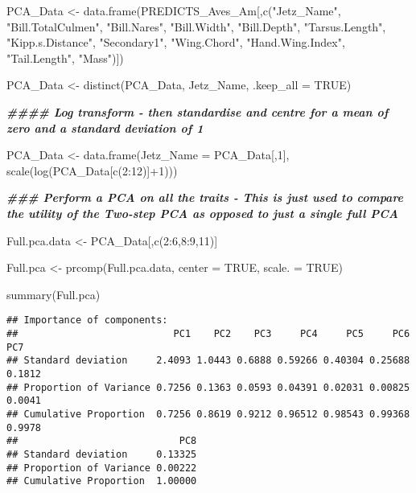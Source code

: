 \documentclass[
]{article}
\newenvironment{Shaded}{\begin{snugshade}}{\end{snugshade}}
\newcommand{\AttributeTok}[1]{\textcolor[rgb]{0.77,0.63,0.00}{#1}}
\newcommand{\ConstantTok}[1]{\textcolor[rgb]{0.00,0.00,0.00}{#1}}
\newcommand{\DecValTok}[1]{\textcolor[rgb]{0.00,0.00,0.81}{#1}}
\newcommand{\DocumentationTok}[1]{\textcolor[rgb]{0.56,0.35,0.01}{\textbf{\textit{#1}}}}
\newcommand{\FunctionTok}[1]{\textcolor[rgb]{0.00,0.00,0.00}{#1}}
\newcommand{\NormalTok}[1]{#1}
\newcommand{\OtherTok}[1]{\textcolor[rgb]{0.56,0.35,0.01}{#1}}
\newcommand{\SpecialCharTok}[1]{\textcolor[rgb]{0.00,0.00,0.00}{#1}}
\newcommand{\StringTok}[1]{\textcolor[rgb]{0.31,0.60,0.02}{#1}}
\begin{document}
\begin{Shaded}
\begin{Highlighting}[]
\NormalTok{PCA\_Data }\OtherTok{\textless{}{-}} \FunctionTok{data.frame}\NormalTok{(PREDICTS\_Aves\_Am[,}\FunctionTok{c}\NormalTok{(}\StringTok{"Jetz\_Name"}\NormalTok{, }\StringTok{"Bill.TotalCulmen"}\NormalTok{, }\StringTok{"Bill.Nares"}\NormalTok{, }\StringTok{"Bill.Width"}\NormalTok{, }\StringTok{"Bill.Depth"}\NormalTok{, }\StringTok{"Tarsus.Length"}\NormalTok{,    }\StringTok{"Kipp.s.Distance"}\NormalTok{, }\StringTok{"Secondary1"}\NormalTok{, }\StringTok{"Wing.Chord"}\NormalTok{, }\StringTok{"Hand.Wing.Index"}\NormalTok{, }\StringTok{"Tail.Length"}\NormalTok{, }\StringTok{"Mass"}\NormalTok{)])}

\NormalTok{PCA\_Data }\OtherTok{\textless{}{-}} \FunctionTok{distinct}\NormalTok{(PCA\_Data, Jetz\_Name, }\AttributeTok{.keep\_all =} \ConstantTok{TRUE}\NormalTok{)}
 

\DocumentationTok{\#\#\#\# Log transform {-} then standardise and centre for a mean of zero and a standard deviation of 1}

\NormalTok{PCA\_Data }\OtherTok{\textless{}{-}} \FunctionTok{data.frame}\NormalTok{(}\AttributeTok{Jetz\_Name =}\NormalTok{ PCA\_Data[,}\DecValTok{1}\NormalTok{], }\FunctionTok{scale}\NormalTok{(}\FunctionTok{log}\NormalTok{(PCA\_Data[}\FunctionTok{c}\NormalTok{(}\DecValTok{2}\SpecialCharTok{:}\DecValTok{12}\NormalTok{)]}\SpecialCharTok{+}\DecValTok{1}\NormalTok{)))}

\DocumentationTok{\#\#\# Perform a PCA on all the traits {-} This is just used to compare the utility of the Two{-}step PCA as opposed to just a single full PCA}

\NormalTok{Full.pca.data }\OtherTok{\textless{}{-}}\NormalTok{ PCA\_Data[,}\FunctionTok{c}\NormalTok{(}\DecValTok{2}\SpecialCharTok{:}\DecValTok{6}\NormalTok{,}\DecValTok{8}\SpecialCharTok{:}\DecValTok{9}\NormalTok{,}\DecValTok{11}\NormalTok{)]}

\NormalTok{Full.pca }\OtherTok{\textless{}{-}} \FunctionTok{prcomp}\NormalTok{(Full.pca.data, }\AttributeTok{center =} \ConstantTok{TRUE}\NormalTok{, }\AttributeTok{scale. =} \ConstantTok{TRUE}\NormalTok{)}

\FunctionTok{summary}\NormalTok{(Full.pca)}
\end{Highlighting}
\end{Shaded}

\begin{verbatim}
## Importance of components:
##                           PC1    PC2    PC3     PC4     PC5     PC6    PC7
## Standard deviation     2.4093 1.0443 0.6888 0.59266 0.40304 0.25688 0.1812
## Proportion of Variance 0.7256 0.1363 0.0593 0.04391 0.02031 0.00825 0.0041
## Cumulative Proportion  0.7256 0.8619 0.9212 0.96512 0.98543 0.99368 0.9978
##                            PC8
## Standard deviation     0.13325
## Proportion of Variance 0.00222
## Cumulative Proportion  1.00000
\end{verbatim}
\end{document}
